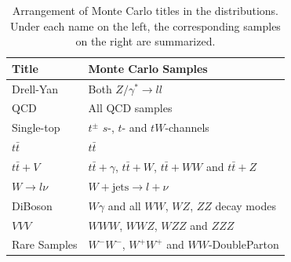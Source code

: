 \begin{table}[!htb]
  \centering
  \begin{tabular}{|l|l|}
\hline
Title & Monte Carlo Samples \\
\hline
Drell-Yan & Both $Z/\gamma^* \rightarrow ll$ \\
QCD & All QCD samples \\
Single-top & $t^\pm$ $s$-, $t$- and $tW$-channels \\
$t \bar{t}$ & $t \bar{t}$ \\
$t \bar{t} + V$ & $t \bar{t} + \gamma$, $t \bar{t} + W$, $t \bar{t} + WW$ and $t \bar{t} + Z$ \\
$W \rightarrow l \nu$ & $W + \text{jets} \rightarrow l + \nu$ \\
DiBoson & $W\gamma$ and all $WW$, $WZ$, $ZZ$ decay modes \\
$VVV$ & $WWW$, $WWZ$, $WZZ$ and $ZZZ$ \\
Rare Samples & $W^-W^-$, $W^+W^+$ and $WW$-DoubleParton \\
\hline
  \end{tabular}
  \caption{Arrangement of Monte Carlo titles in the distributions. Under each name on the left, the corresponding samples on the right are summarized.}
  \label{tab:mcpooltitles}
\end{table}

